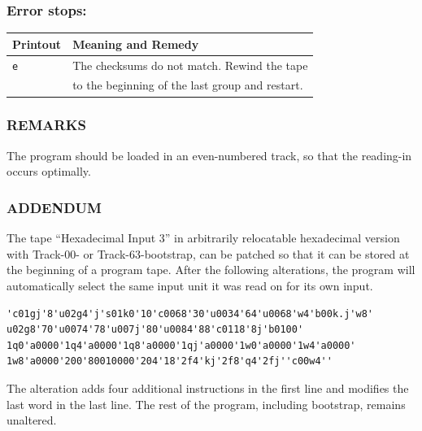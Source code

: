 \subsubsection*{Error stops:}
\begin{table}[h!]
\centering
\begin{tabular}{ll}
\toprule
\textbf{Printout} & \textbf{Meaning and Remedy} \\
\midrule
\texttt{e} & The checksums do not match. Rewind the tape \\
& to the beginning of the last group and restart. \\
\bottomrule
\end{tabular}
\end{table}

\subsubsection*{REMARKS}
The program should be loaded in an even-numbered track, so that the reading-in occurs optimally.

\subsubsection*{ADDENDUM}
The tape ``Hexadecimal Input 3'' in arbitrarily relocatable hexadecimal version with Track-00- or Track-63-bootstrap, can be patched so that it can be stored at the beginning of a program tape. After the following alterations, the program will automatically select the same input unit it was read on for its own input.

\begin{verbatim}
'c01gj'8'u02g4'j's01k0'10'c0068'30'u0034'64'u0068'w4'b00k.j'w8'
u02g8'70'u0074'78'u007j'80'u0084'88'c0118'8j'b0100'
1q0'a0000'1q4'a0000'1q8'a0000'1qj'a0000'1w0'a0000'1w4'a0000'
1w8'a0000'200'80010000'204'18'2f4'kj'2f8'q4'2fj''c00w4''
\end{verbatim}

The alteration adds four additional instructions in the first line and modifies the last word in the last line. The rest of the program, including bootstrap, remains unaltered.

\newpage